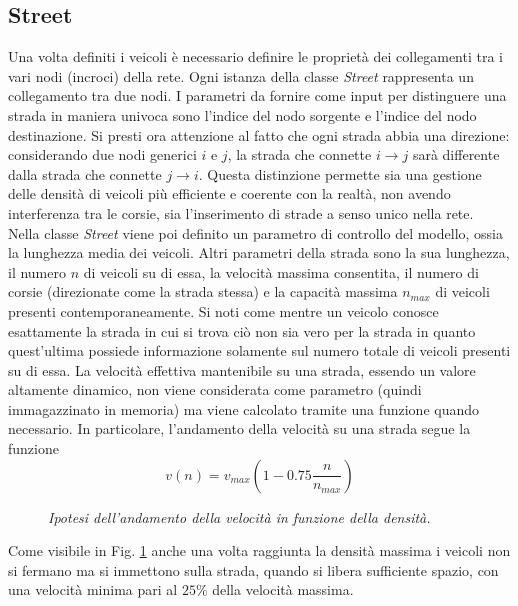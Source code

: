 \documentclass[12pt,a4paper]{report}
\begin{document}
\subsection{Street}
Una volta definiti i veicoli è necessario definire le proprietà dei collegamenti tra i vari nodi (incroci) della rete.
Ogni istanza della classe \emph{Street} rappresenta un collegamento tra due nodi.
I parametri da fornire come input per distinguere una strada in maniera univoca sono l'indice del nodo sorgente e l'indice del nodo destinazione.
Si presti ora attenzione al fatto che ogni strada abbia una direzione: considerando due nodi generici $i$ e $j$, la strada che connette $i\to j$ sarà differente dalla strada che connette $j \to i$.
Questa distinzione permette sia una gestione delle densità di veicoli più efficiente e coerente con la realtà, non avendo interferenza tra le corsie, sia l'inserimento di strade a senso unico nella rete.\\
Nella classe \emph{Street} viene poi definito un parametro di controllo del modello, ossia la lunghezza media dei veicoli.
Altri parametri della strada sono la sua lunghezza, il numero $n$ di veicoli su di essa, la velocità massima consentita, il numero di corsie (direzionate come la strada stessa) e la capacità massima $n_{max}$ di veicoli presenti contemporaneamente.
Si noti come mentre un veicolo conosce esattamente la strada in cui si trova ciò non sia vero per la strada in quanto quest'ultima possiede informazione solamente sul numero totale di veicoli presenti su di essa.
La velocità effettiva mantenibile su una strada, essendo un valore altamente dinamico, non viene considerata come parametro (quindi immagazzinato in memoria) ma viene calcolato tramite una funzione quando necessario.
In particolare, l'andamento della velocità su una strada segue la funzione
\begin{equation}
    v(n)=v_{max}\left(1-0.75\frac{n}{n_{max}}\right)
    \label{equation:velocity}
\end{equation}
\begin{figure}[H]
    \centering
    \caption[Velocità nel modello]{\emph{Ipotesi dell'andamento della velocità in funzione della densità.}}
    \label{figure:velocity}
\end{figure}
Come visibile in Fig. \ref{figure:velocity} anche una volta raggiunta la densità massima i veicoli non si fermano ma si immettono sulla strada, quando si libera sufficiente spazio, con una velocità minima pari al $25\%$ della velocità massima.
\end{document}
